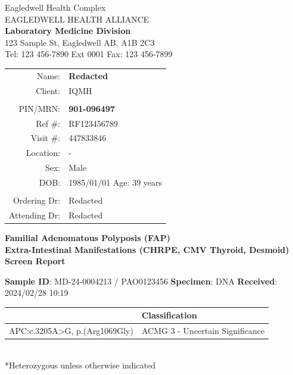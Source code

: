\documentclass[9pt]{extarticle}
\begin{document}
\parbox[b][][]{.42\textwidth}{
\centering
Eagledwell Health Complex\\
EAGLEDWELL HEALTH ALLIANCE \\
\vspace{1em}
{\bf Laboratory Medicine Division}\\ 
\vspace{1em}
123 Sample St, Eagledwell AB, A1B 2C3 \\
Tel: 123 456-7890 Ext 0001 Fax: 123 456-7899
}
\hfill
\parbox{.55\textwidth}{
\large
\begin{tabular}{r l}
Name: & {\bf Redacted}\\
Client:  & IQMH\\
& \\
PIN/MRN:  & {\bf 901-096497} \\
Ref \#: &  RF123456789 \\
Visit \#: &  447833846 \\
Location: &  -\\
Sex: & Male \\
DOB:  & 1985/01/01 \hspace{1ex} Age:\hspace{1ex} 39 years \\
& \\
Ordering Dr:  & Redacted \\
Attending Dr:  & Redacted\\
\end{tabular}
}


\vspace{1ex}
\begin{center}
\Large \bf
Familial Adenomatous Polyposis (FAP)\\
Extra-Intestinal Manifestations (CHRPE, CMV Thyroid, Desmoid) Screen Report
\end{center}
\vspace{1ex}

{\bf Sample ID}: MD-24-0004213 / PAO0123456 \hspace{2em} {\bf Specimen}: DNA \hspace{2em} {\bf Received}: 2024/02/28 10:19\\
\begin{tabular}{ | >{\centering\arraybackslash}p{9cm} | >{\centering\arraybackslash}p{9cm} | }
\hline
{\large \bf Variant*} & {\large \bf Classification} \\ \hline
APC:c.3205A>G, p.(Arg1069Gly) & ACMG 3 - Uncertain Significance \\ \hline
\end{tabular}
\\ *Heterozygous unless otherwise indicated
\end{document}
